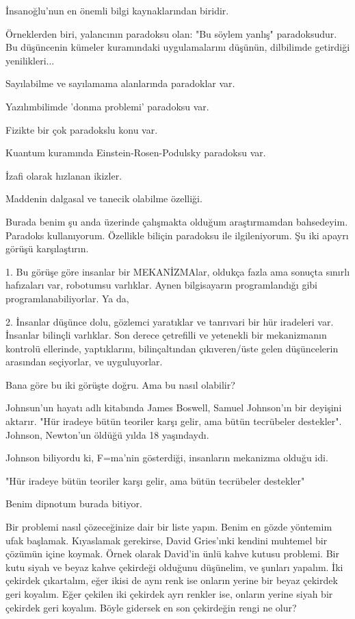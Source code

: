 \documentclass[12pt,fleqn]{article}\usepackage{../../common}
\begin{document}
İnsanoğlu'nun en önemli bilgi kaynaklarından biridir.

Örneklerden biri, yalancının paradoksu olan: "Bu söylem yanlış"
paradoksudur. Bu düşüncenin kümeler kuramındaki uygulamalarını düşünün,
dilbilimde getirdiği yenilikleri...

Sayılabilme ve sayılamama alanlarında paradoklar var.

Yazılımbilimde 'donma problemi' paradoksu var.

Fizikte bir çok paradokslu konu var.

Kuantum kuramında Einstein-Rosen-Podulsky paradoksu var.

İzafi olarak hızlanan ikizler.

Maddenin dalgasal ve tanecik olabilme özelliği.

Burada benim şu anda üzerinde çalışmakta olduğum araştırmamdan
bahsedeyim. Paradoks kullanıyorum. Özellikle biliçin paradoksu ile
ilgileniyorum. Şu iki apayrı görüşü karşılaştırın.

1. Bu görüşe göre insanlar bir MEKANİZMAlar, oldukça fazla ama sonuçta
sınırlı hafızaları var, robotumsu varlıklar. Aynen bilgisayarın
programlandığı gibi programlanabiliyorlar. Ya da,

2. İnsanlar düşünce dolu, gözlemci yaratıklar ve tanrıvari bir hür
iradeleri var. İnsanlar bilinçli varlıklar. Son derece çetrefilli ve
yetenekli bir mekanizmanın kontrolü ellerinde, yaptıklarını, bilinçaltından
çıkıveren/üste gelen düşüncelerin arasından seçiyorlar, ve uyguluyorlar.

Bana göre bu iki görüşte doğru. Ama bu nasıl olabilir?

Johnsun'un hayatı adlı kitabında James Boswell, Samuel Johnson'ın bir deyişini
aktarır. "Hür iradeye bütün teoriler karşı gelir, ama bütün tecrübeler
destekler". Johnson, Newton'un öldüğü yılda 18 yaşındaydı.

Johnson biliyordu ki, F=ma'nin gösterdiği, insanların mekanizma olduğu idi.

"Hür iradeye bütün teoriler karşı gelir, ama bütün tecrübeler destekler"

Benim dipnotum burada bitiyor.

Bir problemi nasıl çözeceğinize dair bir liste yapın. Benim en gözde
yöntemim ufak başlamak. Kıyaslamak gerekirse, David Gries'ınki kendini
muhtemel bir çözümün içine koymak. Örnek olarak David'in ünlü kahve kutusu
problemi. Bir kutu siyah ve beyaz kahve çekirdeği olduğunu düşünelim, ve
şunları yapalım. İki çekirdek çıkartalım, eğer ikisi de aynı renk ise
onların yerine bir beyaz çekirdek geri koyalım. Eğer çekilen iki çekirdek
ayrı renkler ise, onların yerine siyah bir çekirdek geri koyalım. Böyle
gidersek en son çekirdeğin rengi ne olur?
\end{document}
